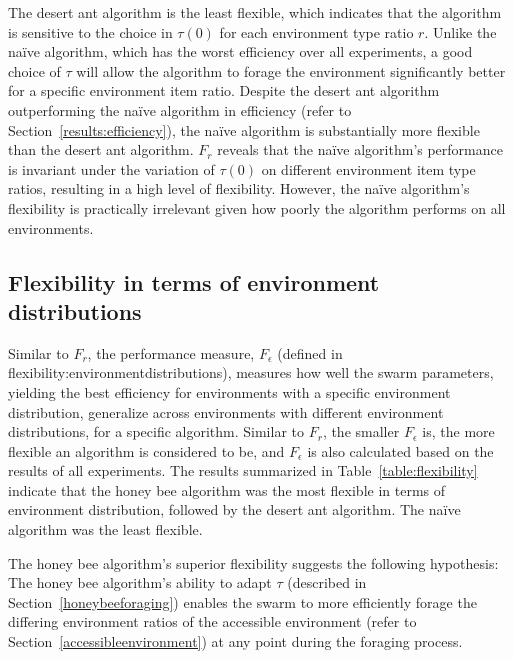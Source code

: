 The desert ant algorithm is the least flexible, which indicates that the algorithm is sensitive to the choice in $\tau(0)$ for each environment type ratio $r$. Unlike the na\"ive algorithm, which has the worst efficiency over all experiments, a good choice of $\tau$ will allow the algorithm to forage the environment significantly better for a specific environment item ratio. Despite the desert ant algorithm outperforming the na\"ive algorithm in efficiency (refer to Section~\ref{results:efficiency}), the na\"ive algorithm is substantially more flexible than the desert ant algorithm. $F_r$ reveals that the na\"ive algorithm's performance is invariant under the variation of $\tau(0)$ on different environment item type ratios, resulting in a high level of flexibility. However, the na\"ive algorithm's flexibility is practically irrelevant given how poorly the algorithm performs on all environments. 


\subsection{Flexibility in terms of environment distributions}
\label{results:flexibility:environmentdistribution}

Similar to $F_r$, the performance measure, $F_\epsilon$ (defined in flexibility:environmentdistributions), measures how well the swarm parameters, yielding the best efficiency for environments with a specific environment distribution, generalize across environments with different environment distributions, for a specific algorithm. Similar to $F_r$, the smaller $F_\epsilon$ is, the more flexible an algorithm is considered to be, and $F_\epsilon$ is also calculated based on the results of all experiments. The results summarized in Table~\ref{table:flexibility} indicate that the honey bee algorithm was the most flexible in terms of environment distribution, followed by the desert ant algorithm. The na\"ive algorithm was the least flexible.

The honey bee algorithm's superior flexibility suggests the following hypothesis: The honey bee algorithm's ability to adapt $\tau$ (described in Section~\ref{honeybeeforaging}) enables the swarm to more efficiently forage the differing environment ratios of the accessible environment (refer to Section~\ref{accessibleenvironment}) at any point during the foraging process.

